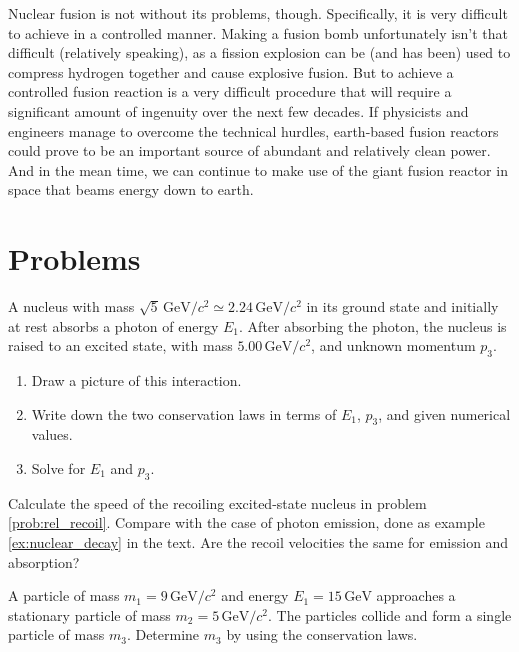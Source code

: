 Nuclear fusion is not  without its problems, though.  Specifically, it
is very difficult to achieve  in a controlled manner.  Making a fusion
bomb unfortunately isn't that  difficult (relatively speaking), as a
fission  explosion can  be (and  has been)  used to  compress hydrogen
together  and cause  explosive fusion.   But to  achieve  a controlled
fusion  reaction is  a very  difficult procedure  that will  require
a significant  amount  of  ingenuity  over  the next  few  decades.
If physicists  and engineers  manage to  overcome the  technical hurdles,
earth-based fusion reactors  could prove to be an  important source of
abundant and relatively  clean power. And in the mean  time, we can
continue to make use of the giant fusion reactor in space that beams
energy down to earth.  





\section*{Problems}


\begin{exercise}
  A nucleus with mass $\sqrt{5}\,\text{GeV}/c^2\simeq 2.24\,\text{GeV}/c^2$ 
  in its ground state and initially at rest absorbs a photon of energy $E_1$.  
  After absorbing the photon, the nucleus is raised to an excited state, 
  with mass $5.00\,\text{GeV}/c^2$, and 
  unknown momentum $p_3$.
  \begin{enumerate}
  \item Draw a picture of this interaction.
  \item Write down the two conservation laws in terms of $E_1$, $p_3$,
    and given numerical values.
  \item Solve for $E_1$ and $p_3$.
  \end{enumerate}
  \label{prob:rel_recoil}
\end{exercise}

\begin{exercise}
  Calculate the speed of the recoiling excited-state nucleus in
  problem \ref{prob:rel_recoil}.  Compare with the case of photon
  emission, done as example \ref{ex:nuclear_decay} in the text.  Are
  the recoil velocities the same for emission and absorption?
  \label{prob:rel_recoil2}
\end{exercise}

\begin{exercise}
  A particle of mass $m_1 = 9\,\text{GeV}/c^2$ and energy $E_1 =
  15\,\text{GeV}$ approaches a stationary particle of mass $m_2 =
  5\,\text{GeV}/c^2$.  The particles collide and form a single
  particle of mass $m_3$.  Determine $m_3$ by using the conservation
  laws.
\end{exercise}

